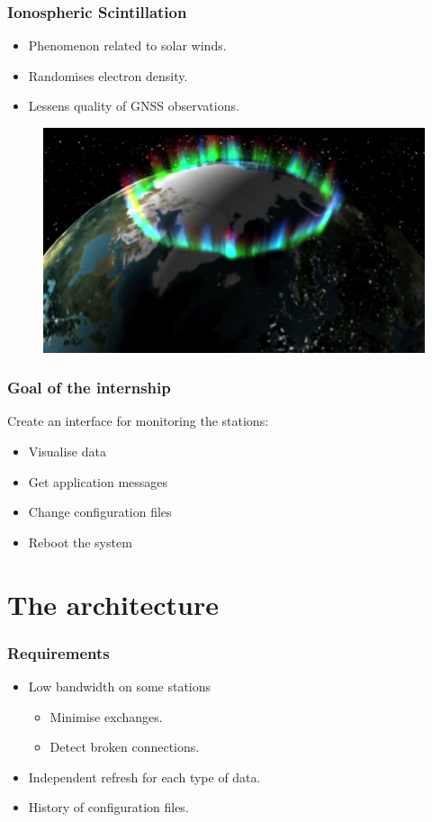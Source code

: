\documentclass{beamer}
\begin{document}

\begin{frame}
\frametitle{Ionospheric Scintillation}
\begin{itemize}
	\item[] Phenomenon related to solar winds.
	\item[] Randomises electron density.
	\item[] Lessens quality of GNSS observations.
\end{itemize}

\begin{figure}
	\includegraphics[width=0.7\linewidth]{images/auroral_oval}
\end{figure}

\end{frame}



\begin{frame}
\frametitle{Goal of the internship}

Create an interface for monitoring the stations:
\begin{itemize}
	\item Visualise data
	\item Get application messages %
	\item Change configuration files
	\item Reboot the system
\end{itemize}

\end{frame}


\section{The architecture}

\begin{frame}
\frametitle{Requirements}
\begin{itemize}
	\item Low bandwidth on some stations
	\begin{itemize}[label=$\Rightarrow$]
		\item Minimise exchanges.
		\item Detect broken connections.
	\end{itemize}
	\item Independent refresh for each type of data.
	\item History of configuration files.
\end{itemize}
\end{frame}
\end{document}
